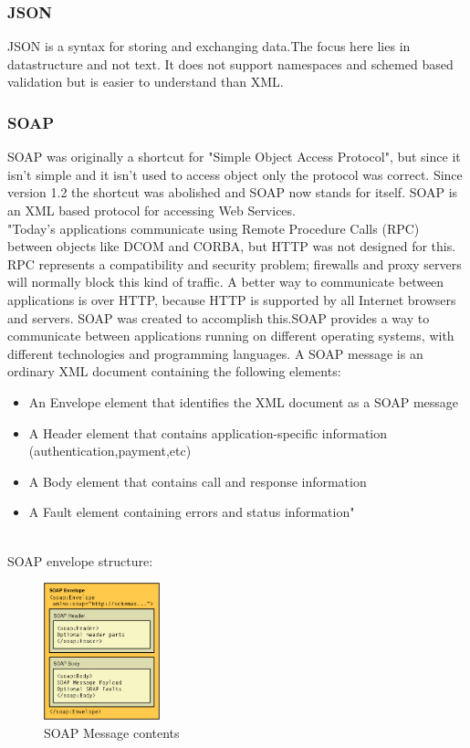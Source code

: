 \documentclass[12pt]{article}
\begin{document}
\subsubsection{JSON}
JSON is a syntax for storing and exchanging data.The focus here lies in datastructure and not text.
It does not support namespaces and schemed based validation but is easier to understand than XML.
\subsubsection{SOAP}
SOAP was originally a shortcut for "Simple Object Access Protocol", but since it isn't simple 
and it isn't used to access object only the protocol was correct. Since version 1.2 the shortcut
was abolished and SOAP now stands for itself. SOAP is an XML based protocol for accessing Web Services. \\
"Today's applications communicate using Remote Procedure Calls (RPC) between objects like DCOM and CORBA, but HTTP was not designed for this. RPC represents a compatibility and security problem; firewalls and proxy servers will normally block this kind of traffic. A better way to communicate between applications is over HTTP, because HTTP is supported by all Internet browsers and servers. SOAP was created to accomplish this.SOAP provides a way to communicate between applications running on different operating systems, with different technologies and programming languages. A SOAP message is an ordinary XML document containing the following elements:
\begin{itemize}
\item An Envelope element that identifies the XML document as a SOAP message
\item A Header element that contains application-specific information (authentication,payment,etc)
\item A Body element that contains call and response information
\item A Fault element containing errors and status information"
\end{itemize}
\cite{soap}\\
SOAP envelope structure:
\begin{figure}[here!]
	\centering
	\includegraphics[width=0.3\textwidth]{images/f02mp01}
	\caption{SOAP Message contents \cite{vogtbild2}}
    \label{fig:Soapenvelope}
	\end{figure}
	\FloatBarrier
	
\end{document}
